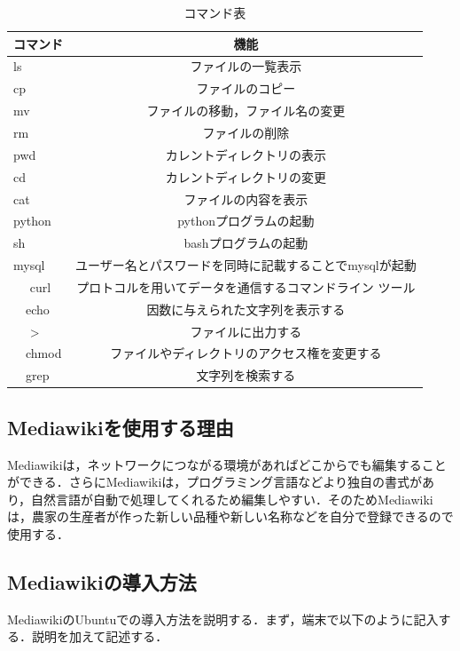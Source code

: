 \begin{table}[htb]
  \begin{center}
  \begin{tabular}{|l|c|} \hline
    コマンド & 機能 \\ \hline \hline
    ls & ファイルの一覧表示 \\  \hline
    cp & ファイルのコピー \\  \hline
    mv & ファイルの移動，ファイル名の変更 \\ \hline
    rm & ファイルの削除 \\  \hline
    pwd & カレントディレクトリの表示 \\  \hline
    cd & カレントディレクトリの変更 \\ \hline
    cat & ファイルの内容を表示 \\  \hline
   python & pythonプログラムの起動  \\  \hline
   sh & bashプログラムの起動 \\  \hline
  mysql & ユーザー名とパスワードを同時に記載することでmysqlが起動 \\ \hline
　 curl & プロトコルを用いてデータを通信するコマンドライン ツール \\  \hline
　echo & 因数に与えられた文字列を表示する \\  \hline
　  > & ファイルに出力する \\  \hline
　chmod &ファイルやディレクトリのアクセス権を変更する \\  \hline
　grep & 文字列を検索する \\  \hline
  \end{tabular}
  \end{center}
\caption{コマンド表}
\end{table}

\clearpage

\subsection{Mediawikiを使用する理由}
Mediawikiは，ネットワークにつながる環境があればどこからでも編集することができる．さらにMediawikiは，プログラミング言語などより独自の書式があり，自然言語が自動で処理してくれるため編集しやすい．そのためMediawikiは，農家の生産者が作った新しい品種や新しい名称などを自分で登録できるので使用する．

\subsection{Mediawikiの導入方法}
MediawikiのUbuntuでの導入方法を説明する．まず，端末で以下のように記入する．説明を加えて記述する．

